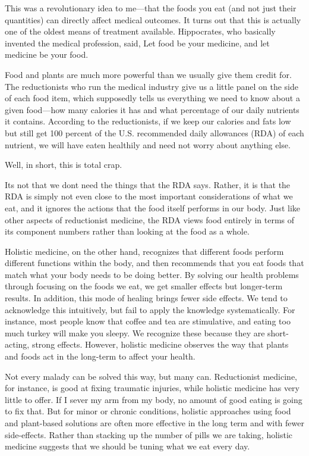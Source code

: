 This was a revolutionary idea to me—that the foods you eat (and not just
their quantities) can directly affect medical outcomes. It turns out
that this is actually one of the oldest means of treatment available.
Hippocrates, who basically invented the medical profession, said,
{\textquotedbl}Let food be your medicine, and let medicine be your
food.{\textquotedbl}  


Food and plants are much more powerful than we usually give them credit
for. The reductionists who run the medical industry give us a little
panel on the side of each food item, which supposedly tells us
everything we need to know about a given food—how many calories it has
and what percentage of our daily nutrients it contains. According to
the reductionists, if we keep our calories and fats low but still get
100 percent of the U.S. recommended daily allowances (RDA) of each
nutrient, we will have eaten healthily and need not worry about
anything else.


Well, in short, this is total crap.


It{\textquotesingle}s not that we don{\textquotesingle}t need the things
that the RDA says. Rather, it is that the RDA is simply not even close
to the most important considerations of what we eat, and it ignores the
actions that the food itself performs in our body. Just like other
aspects of reductionist medicine, the RDA views food entirely in terms
of its component numbers rather than looking at the food as a whole. 


Holistic medicine, on the other hand, recognizes that different foods
perform different functions within the body, and then recommends that
you eat foods that match what your body needs to be doing better. By
solving our health problems
through focusing on
the foods we eat, we get smaller effects but longer-term results. In
addition, this mode of healing brings fewer side effects.  We tend to
acknowledge this intuitively, but fail to apply the knowledge
systematically.  For instance, most people know that coffee and tea are
stimulative, and eating too much turkey will make you sleepy.  We
recognize these because they are short-acting, strong effects. 
However, holistic medicine observes the way that plants and foods act
in the long-term to affect your health.


Not every malady can be solved this way, but many can. Reductionist
medicine, for instance, is good at fixing traumatic injuries, while
holistic medicine has very little to offer. If I sever my arm from my
body, no amount of good eating is going to fix that. But for minor or
chronic conditions, holistic approaches using food and plant-based
solutions are often more effective in the long term
and with fewer
side-effects.  Rather than stacking up the number of pills we are
taking, holistic medicine suggests that we should be tuning what we eat
every day.


